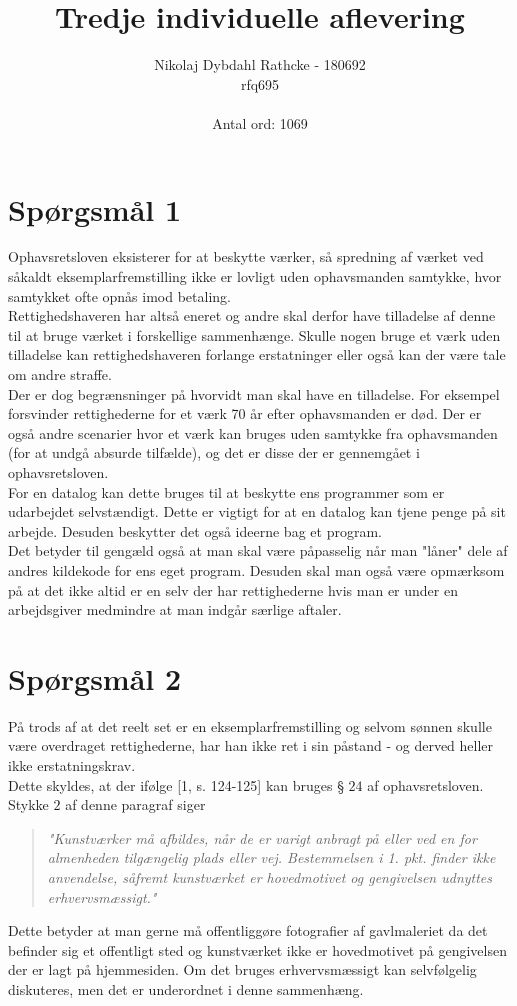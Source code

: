 \documentclass[12pt]{article}
\title{Tredje individuelle aflevering}
\author{Nikolaj Dybdahl Rathcke - 180692 \\ rfq695 \\\\ Antal ord: 1069}
\begin{document}
\maketitle

\section*{Spørgsmål 1}
Ophavsretsloven eksisterer for at beskytte værker, så spredning af værket ved såkaldt eksemplarfremstilling ikke er lovligt uden ophavsmanden samtykke, hvor samtykket ofte opnås imod betaling.\\
Rettighedshaveren har altså eneret og andre skal derfor have tilladelse af denne til at bruge værket i forskellige sammenhænge. Skulle nogen bruge et værk uden tilladelse kan rettighedshaveren forlange erstatninger eller også kan der være tale om andre straffe.\\
Der er dog begrænsninger på hvorvidt man skal have en tilladelse. For eksempel forsvinder rettighederne for et værk 70 år efter ophavsmanden er død. Der er også andre scenarier hvor et værk kan bruges uden samtykke fra ophavsmanden (for at undgå absurde tilfælde), og det er disse der er gennemgået i ophavsretsloven.\\
For en datalog kan dette bruges til at beskytte ens programmer som er udarbejdet selvstændigt. Dette er vigtigt for at en datalog kan tjene penge på sit arbejde. Desuden beskytter det også ideerne bag et program.\\
Det betyder til gengæld også at man skal være påpasselig når man "låner" dele af andres kildekode for ens eget program. Desuden skal man også være opmærksom på at det ikke altid er en selv der har rettighederne hvis man er under en arbejdsgiver medmindre at man indgår særlige aftaler.

\section*{Spørgsmål 2}
På trods af at det reelt set er en eksemplarfremstilling og selvom sønnen skulle være overdraget rettighederne, har han ikke ret i sin påstand - og derved heller ikke erstatningskrav. \\
Dette skyldes, at der ifølge [1, s. 124-125] kan bruges § $24$ af ophavsretsloven. Stykke $2$ af denne paragraf siger
\begin{quote}
\textit{"Kunstværker må afbildes, når de er varigt anbragt på eller ved en for almenheden tilgængelig plads eller vej. Bestemmelsen i 1. pkt. finder ikke anvendelse, såfremt kunstværket er hovedmotivet og gengivelsen udnyttes erhvervsmæssigt."}
\end{quote}
Dette betyder at man gerne må offentliggøre fotografier af gavlmaleriet da det befinder sig et offentligt sted og kunstværket ikke er hovedmotivet på gengivelsen der er lagt på hjemmesiden. Om det bruges erhvervsmæssigt kan selvfølgelig diskuteres, men det er underordnet i denne sammenhæng.
\end{document}
